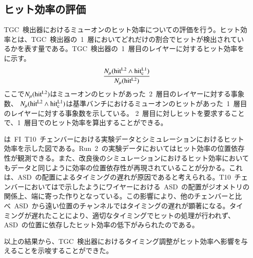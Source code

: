 \subsection{ヒット効率の評価}
TGC~検出器におけるミューオンのヒット効率についての評価を行う。ヒット効率とは、TGC~検出器の~1~層においてどれだけの割合でヒットが検出されているかを表す量である。TGC~検出器の~1~層目のレイヤーに対するヒット効率をに示す。
\begin{align}
        \frac{N_{\mu}(\rm{hit^{L2}\land hit^{L1}_c)}}{N_{\mu}(\rm{hit^{L2}})}
    \label{eq:hit}
\end{align}
ここで$N_{\mu}(\rm{hit^{L2}})$はミューオンのヒットがあった~2~層目のレイヤーに対する事象数、
$N_{\mu}(\rm{hit^{L2}\land hit^{L1}_c)}$は基準バンチにおけるミューオンのヒットがあった~1~層目のレイヤーに対する事象数を示している。
2~層目に対しヒットを要求することで、1~層目でのヒット効率を算出することができる。

は~FI~T10~チェンバーにおける実験データとシミュレーションにおけるヒット効率を示した図である。Run~2~の実験データにおいてはヒット効率の位置依存性が観測できる。また、改良後のシミュレーションにおけるヒット効率においてもデータと同じように効率の位置依存性が再現されていることが分かる。これは、ASD~の配置によるタイミングの遅れが原因であると考えられる。T10~チェンバーにおいてはで示したようにワイヤーにおける~ASD~の配置がジオメトリの関係上、端に寄った作りとなっている。この影響により、他のチェンバーと比べ~ASD~から遠い位置のチャンネルではタイミングの遅れが顕著になる。タイミングが遅れたことにより、適切なタイミングでヒットの処理が行われず、ASD~の位置に依存したヒット効率の低下がみられたのである。

以上の結果から、TGC~検出器におけるタイミング調整がヒット効率へ影響を与えることを示唆することができた。

